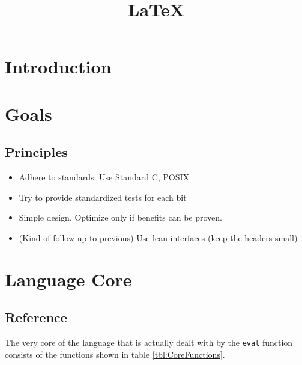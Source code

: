 \documentclass[12pt]{article}
\title{\LaTeX}
\date{}
\begin{document}
\section{Introduction}

\section{Goals}

\subsection{Principles}

\begin{itemize}
    \item Adhere to standards: Use Standard C, POSIX
    \item Try to provide standardized tests for each bit 
    \item Simple design. Optimize only if benefits can be proven.
    \item (Kind of follow-up to previous) Use lean interfaces (keep the headers
        small)
\end{itemize}

\section{Language Core}

\subsection{Reference}

The very core of the language that is actually dealt with by the \texttt{eval}
function consists of the functions shown in table \ref{tbl:CoreFunctions}.
\end{document}
